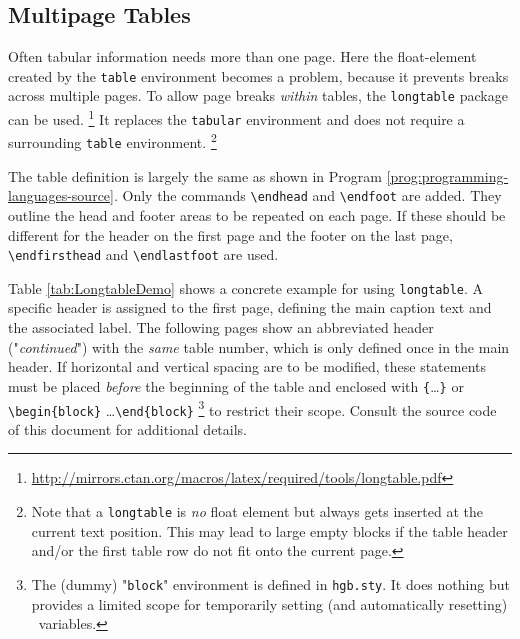 \subsection{Multipage Tables}

Often tabular information needs more than one page. Here the float-element
created by the \texttt{table} environment becomes a problem, because it
prevents breaks across multiple pages. To allow page breaks \emph{within}
tables, the \texttt{longtable} package can be used.%
\footnote{%
\url{http://mirrors.ctan.org/macros/latex/required/tools/longtable.pdf}}
It replaces the \texttt{tabular} environment and does not require a
surrounding \texttt{table} environment.%
\footnote{Note that a \texttt{longtable} is \emph{no} float element but 
always gets inserted at the current text position. This may lead to large
empty blocks if the table header and/or the first table row do not fit onto
the current page.}

The table definition is largely the same as shown in Program
\ref{prog:programming-languages-source}. Only the commands \verb|\endhead|
and \verb|\endfoot| are added. They outline the head and footer areas to be
repeated on each page. If these should be different for the header on the
first page and the footer on the last page, \verb|\endfirsthead| and
\verb|\endlastfoot| are used.

Table \ref{tab:LongtableDemo} shows a concrete example for using 
\texttt{longtable}. A specific header is assigned to the first page, 
defining the main caption text and the associated label.
The following pages show an abbreviated header ("\emph{continued}") with the
\emph{same} table number, which is only defined once in the main header. 
If horizontal and vertical spacing are to be modified, these statements must
be placed \emph{before} the beginning of the table and enclosed with
\verb|{|\ldots\verb|}| or \verb|\begin{block}| \ldots \verb|\end{block}|%
\footnote{The (dummy) "\texttt{block}" environment is defined in 
\texttt{hgb.sty}. It does nothing but provides a limited scope for
temporarily setting (and automatically resetting) \latex\ variables.}
to restrict their scope. Consult the source code of this document for
additional details.

